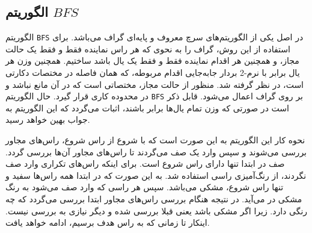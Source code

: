 \subsection{الگوریتم $BFS$}
الگوریتم \verb|BFS| در اصل یکی از الگوریتم‌های سرچ معروف و پایه‌ای گراف می‌باشد. برای استفاده از این روش، گراف را به نحوی که هر راس نماینده فقط و فقط یک حالت مجاز، و همچنین هر اقدام نماینده فقط و فقط یک یال باشد ساختیم. همچنین وزن هر یال برابر با نرم-2 بردار جابه‌جایی اقدام مربوطه، که همان فاصله در مختصات دکارتی است، در نظر گرفته شد. منظور از حالت مجاز، مختصاتی است که در آن مانع نباشد و در محدوده کاری قرار گیرد. حال الگوریتم \verb|BFS| بر روی گراف اعمال می‌شود. قابل ذکر است در صورتی که وزن تمام یال‌ها برابر باشند، اثبات می‌گردد که این الگوریتم به جواب بهین خواهد رسید.

نحوه کار این الگوریتم به این صورت است که با شروع از راس شروع، راس‌های مجاور بررسی می‌شوند و سپس وارد یک صف می‌گردند تا راس‌های مجاور آن‌ها بررسی گردد. صف در ابتدا تنها دارای راس شروع است. برای اینکه راس‌های تکراری وارد صف نگردند، از رنگ‌آمیزی راسی استفاده شد. به این صورت که در ابتدا همه راس‌ها سفید و تنها راس شروع، مشکی می‌باشد. سپس هر راسی که وارد صف می‌شود به رنگ مشکی در می‌آید. در نتیجه هنگام بررسی راس‌های مجاور ابتدا بررسی می‌گردد که چه رنگی دارد. زیرا اگر مشکی باشد یعنی قبلا بررسی شده و دیگر نیازی به بررسی نیست. اینکار تا زمانی که به راس هدف برسیم، ادامه خواهد یافت.

